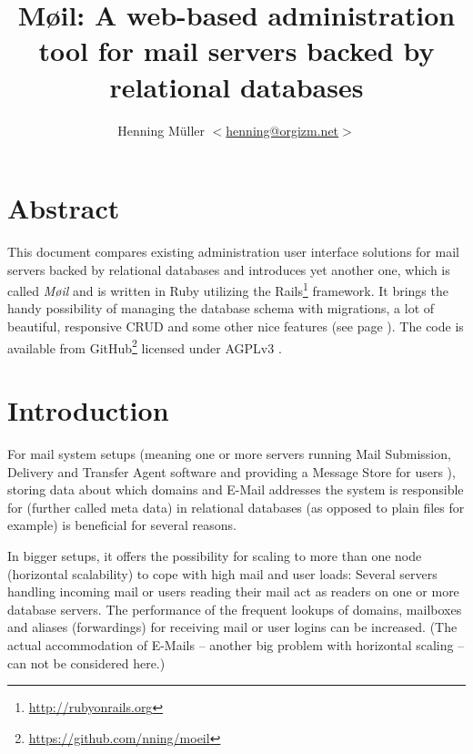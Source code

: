 \documentclass[12pt,a4paper]{scrartcl}
\begin{document}
	\title{Møil: A web-based administration tool for mail servers backed by relational databases}
	\author{Henning Müller $<$\href{mailto:henning@orgizm.net}{henning@orgizm.net}$>$}
	\date{}

	\maketitle


	\section*{Abstract}
		This document compares existing administration user interface solutions
		for mail servers backed by relational databases and introduces yet
		another one, which is called \emph{Møil} and is written in Ruby
		utilizing the \ac{Rails}\footnote{\url{http://rubyonrails.org}}
		framework. It brings the handy possibility of managing the database
		schema with migrations, a lot of beautiful, responsive \acs{CRUD} and
		some other nice features (see page \pageref{sec:moeil:features}). The
		code is available from
		GitHub\footnote{\url{https://github.com/nning/moeil}} licensed under
		AGPLv3 \cite{agpl}.

	\section*{Introduction}

		For mail system setups (meaning one or more servers running Mail
		Submission, Delivery and Transfer Agent software and providing a
		Message Store for users \cite{mail-architecture}), storing data about
		which domains and E-Mail addresses the system is responsible for
		(further called meta data) in relational databases (as opposed to plain
		files for example) is beneficial for several reasons.


		In bigger setups, it offers the possibility for scaling to more than
		one node (horizontal scalability) to cope with high mail and user
		loads: Several servers handling incoming mail or users reading their
		mail act as readers on one or more database servers. The performance of
		the frequent lookups of domains, mailboxes and aliases (forwardings)
		for receiving mail or user logins can be increased. (The actual
		accommodation of E-Mails -- another big problem with horizontal scaling
		-- can not be considered here.)
\end{document}
